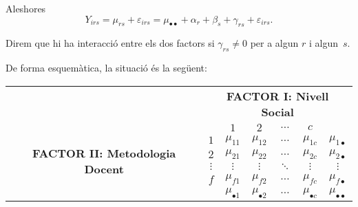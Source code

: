Aleshores
$$Y_{irs} = \mu_{rs} + \varepsilon_{irs} = \mu_{\bullet\bullet} + \alpha_r + \beta_s +
\gamma_{rs} + \varepsilon_{irs}.$$

Direm que hi ha interacci\'o entre els dos factors si $\gamma_{rs} \not = 0$ per a
algun $r$ i algun~$s$.

De forma esquem\`atica, la situaci\'o \'es la seg\"uent:

\begin{center}
\begin{tabular}{c|c|cccc|c|}
\multicolumn{1}{c}{}&\multicolumn{6}{c}{{\bf FACTOR I: Nivell Social}}\\\cline{2-7}
\multirow{6}{3cm}{{\bf FACTOR II: Metodologia Docent}}&&$1$&$2$&$\ldots$&$c$&\\\cline{2-7}
&$1$&$\mu_{11}$&$\mu_{12}$&$\ldots$&$\mu_{1c}$&$\mu_{1\bullet}$\\
&$2$&$\mu_{21}$&$\mu_{22}$&$\ldots$&$\mu_{2c}$&$\mu_{2\bullet}$\\
&$\vdots$&$\vdots$&$\vdots$&$\ddots$&$\vdots$&$\vdots$\\
&$f$&$\mu_{f1}$&$\mu_{f2}$&$\ldots$&$\mu_{fc}$&$\mu_{f\bullet}$\\\cline{2-7}
&&$\mu_{\bullet 1}$&$\mu_{\bullet 2}$&$\ldots$&$\mu_{\bullet c}$&$\mu_{\bullet\bullet}$\\\cline{2-7}
\end{tabular}
\end{center}


